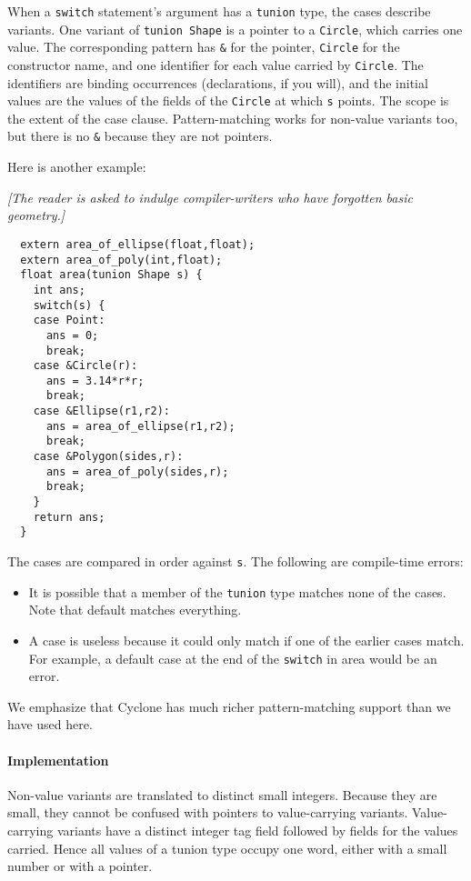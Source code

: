 When a \texttt{switch} statement's argument has a \texttt{tunion} type,
the cases describe variants.  One variant of \texttt{tunion Shape} is a
pointer to a \texttt{Circle}, which carries one value.  The
corresponding pattern has \texttt{\&} for the pointer, \texttt{Circle} for
the constructor name, and one identifier for each value carried by
\texttt{Circle}.  The identifiers are binding occurrences (declarations,
if you will), and the initial values are the values of the fields of
the \texttt{Circle} at which \texttt{s} points.  The scope is the extent
of the case clause.  Pattern-matching works for non-value variants
too, but there is no \texttt{\&} because they are not pointers.

Here is another example:

\textit{[The reader is asked to indulge compiler-writers who have
  forgotten basic geometry.]}
\begin{verbatim}
  extern area_of_ellipse(float,float);
  extern area_of_poly(int,float);
  float area(tunion Shape s) {
    int ans;
    switch(s) {
    case Point:
      ans = 0;
      break;
    case &Circle(r):
      ans = 3.14*r*r;
      break;
    case &Ellipse(r1,r2):
      ans = area_of_ellipse(r1,r2);
      break;
    case &Polygon(sides,r):
      ans = area_of_poly(sides,r);
      break;
    }
    return ans;
  }
\end{verbatim}

The cases are compared in order against \texttt{s}.  The following are
compile-time errors:
\begin{itemize}
\item It is possible that a member of the \texttt{tunion} type matches
  none of the cases.  Note that default matches everything.
\item A case is useless because it could only match if one of the
  earlier cases match.  For example, a default case at the end of the
  \texttt{switch} in area would be an error.
\end{itemize}

We emphasize that Cyclone has much richer pattern-matching support
than we have used here.

\paragraph{Implementation}
Non-value variants are translated to distinct small integers.  Because
they are small, they cannot be confused with pointers to
value-carrying variants.  Value-carrying variants have a distinct
integer tag field followed by fields for the values carried.  Hence
all values of a tunion type occupy one word, either with a small
number or with a pointer.

